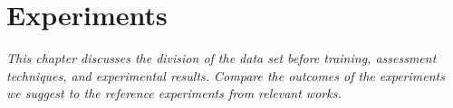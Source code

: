 \chapter{Experiments}
\label{chap:experiments}
	\textit{This chapter discusses the division of the data set before training, assessment techniques, and experimental results. Compare the outcomes of the experiments we suggest to the reference experiments from relevant works.}
\minitoc

	

